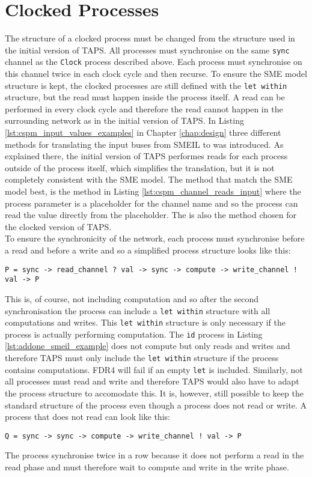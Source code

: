 \section{Clocked Processes}
The structure of a clocked process must be changed from the structure used in the initial version of TAPS. All processes must synchronise on the same \texttt{sync} channel as the \texttt{Clock} process described above. Each process must synchronise on this channel twice in each clock cycle and then recurse. To ensure the SME model structure is kept, the clocked processes are still defined with the \texttt{let within} structure, but the read must happen inside the process itself. A read can be performed in every clock cycle and therefore the read cannot happen in the surrounding network as in the initial version of TAPS.
In Listing \ref{lst:cspm_input_values_examples} in Chapter \ref{chap:design} three different methods for translating the input buses from SMEIL to \cspm{} was introduced. As explained there, the initial version of TAPS performes reads for each process outside of the process itself, which simplifies the translation, but it is not completely consistent with the SME model. The method that match the SME model best, is the method in Listing \ref{lst:cspm_channel_reads_input} where the process parameter is a placeholder for the channel name and so the process can read the value directly from the placeholder. The is also the method chosen for the clocked version of TAPS. \\

To ensure the synchronicity of the network, each process must synchronise before a read and before a write and so a simplified process structure looks like this:
\begin{verbatim}
P = sync -> read_channel ? val -> sync -> compute -> write_channel ! val -> P
\end{verbatim}
This is, of course, not including computation and so after the second synchronisation the process can include a \texttt{let within} structure with all computations and writes. This \texttt{let within} structure is only necessary if the process is actually performing computation. The \texttt{id} process in Listing \ref{lst:addone_smeil_example} does not compute but only reads and writes and therefore TAPS must only include the \texttt{let within} structure if the process contains computations. FDR4 will fail if an empty \texttt{let} is included. Similarly, not all processes must read and write and therefore TAPS would also have to adapt the process structure to accomodate this. It is, however, still possible to keep the standard structure of the process even though a process does not read or write. A process that does not read can look like this:
\begin{verbatim}
Q = sync -> sync -> compute -> write_channel ! val -> P
\end{verbatim}
The process synchronise twice in a row because it does not perform a read in the read phase and must therefore wait to compute and write in the write phase. \\

